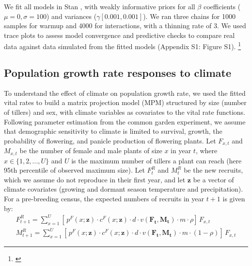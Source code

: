 \documentclass[11pt]{article}\usepackage[]{graphicx}\usepackage[usenames,dvipsnames]{xcolor}
\newcommand{\tom}[2]{{\color{red}{#1}}\footnote{\textit{\color{red}{#2}}}}
\begin{document}
We fit all models in Stan \citep{rstan}, with weakly informative priors for all $\beta$ coefficients ($\mu = 0, \sigma = 100$) and variances ($\gamma [0.001, 0.001]$). 
We ran three chains for 1000 samples for warmup and 4000 for interactions, with a thinning rate of 3. 
We used trace plots to assess model convergence and predictive checks to compare real data against data simulated from the fitted models \citep{piironen2017comparison} (Appendix S1: Figure S1).
\tom{To understand the effect of climate on vital rates, we got the 95 \% credible interval of the posterior distribution.}{Because there are quadratic terms in the model I don't think the coefficients really tell the story of climate effects. It's much more effective to look at your plots of the functions, though it could still be fine to include the coefficient plot in the appendix. One concern: there are 24 coefficients in the model you have written above but only 21 in the Posterior\_mean.pdf coefficient plot.}  

\subsection*{Population growth rate responses to climate}
To understand the effect of climate on population growth rate, we used the fitted vital rates to build a matrix projection model (MPM) structured by size (number of tillers) and sex, with climate variables as covariates to the vital rate functions. 
Following parameter estimation from the common garden experiment, we assume that demographic sensitivity to climate is limited to survival, growth, the probability of flowering, and panicle production of flowering plants.  
Let $F_{x,t}$ and $M_{x,t}$ be the number of female and male plants of size $x$ in year $t$, where $x \in \{1,2,...,U\}$ and $U$ is the maximum number of tillers a plant can reach (here 95th percentile of observed maximum size).
Let $F^{R}_{t}$ and $M^{R}_{t}$ be the new recruits, which we assume do not reproduce in their first year, and let $\mathbf{z}$ be a vector of climate covariates (growing and dormant season temperature and precipitation).
For a pre-breeding census, the expected numbers of recruits in year $t+1$ is given by:
\begin{align}\label{eq:recruits}
F^{R}_{t+1} = \sum_{x=1}^{U} 	[ \, p^{F}(x;\mathbf{z}) \cdot c^{F}(x;\mathbf{z}) \cdot d \cdot v(\mathbf{F_{t}},\mathbf{M_{t}}) \cdot m \cdot \rho 	] \, F_{x,t}
\\
M^{R}_{t+1} = \sum_{x=1}^{U} 	[ \, p^{F}(x;\mathbf{z}) \cdot c^{F}(x;\mathbf{z}) \cdot d \cdot v(\mathbf{F_{t}},\mathbf{M_{t}}) \cdot m \cdot (1-\rho) 	] \, F_{x,t}
\end{align}
\end{document}
